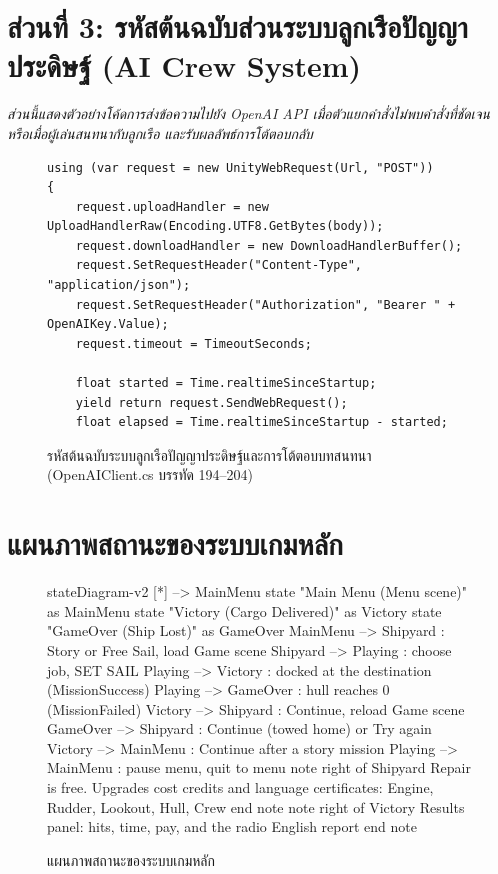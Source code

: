 \section*{ส่วนที่ 3: รหัสต้นฉบับส่วนระบบลูกเรือปัญญาประดิษฐ์ (AI Crew System)}
\textit{ส่วนนี้แสดงตัวอย่างโค้ดการส่งข้อความไปยัง OpenAI API เมื่อตัวแยกคำสั่งไม่พบคำสั่งที่ชัดเจนหรือเมื่อผู้เล่นสนทนากับลูกเรือ และรับผลลัพธ์การโต้ตอบกลับ}


\begin{figure}[H]
\centering
\begin{lstlisting}[language={[Sharp]C},basicstyle=\ttfamily\footnotesize,firstnumber=194]
using (var request = new UnityWebRequest(Url, "POST"))
{
    request.uploadHandler = new UploadHandlerRaw(Encoding.UTF8.GetBytes(body));
    request.downloadHandler = new DownloadHandlerBuffer();
    request.SetRequestHeader("Content-Type", "application/json");
    request.SetRequestHeader("Authorization", "Bearer " + OpenAIKey.Value);
    request.timeout = TimeoutSeconds;

    float started = Time.realtimeSinceStartup;
    yield return request.SendWebRequest();
    float elapsed = Time.realtimeSinceStartup - started;
\end{lstlisting}
\caption{รหัสต้นฉบับระบบลูกเรือปัญญาประดิษฐ์และการโต้ตอบบทสนทนา (OpenAIClient.cs บรรทัด 194--204)}
\label{fig:code_ai}
\end{figure}


\section*{แผนภาพสถานะของระบบเกมหลัก}


\begin{figure}[H]
\centering
\begin{mermaid}
stateDiagram-v2
    [*] --> MainMenu
    state "Main Menu (Menu scene)" as MainMenu
    state "Victory (Cargo Delivered)" as Victory
    state "GameOver (Ship Lost)" as GameOver
    MainMenu --> Shipyard : Story or Free Sail, load Game scene
    Shipyard --> Playing : choose job, SET SAIL
    Playing --> Victory : docked at the destination (MissionSuccess)
    Playing --> GameOver : hull reaches 0 (MissionFailed)
    Victory --> Shipyard : Continue, reload Game scene
    GameOver --> Shipyard : Continue (towed home) or Try again
    Victory --> MainMenu : Continue after a story mission
    Playing --> MainMenu : pause menu, quit to menu
    note right of Shipyard
        Repair is free.
        Upgrades cost credits and language certificates:
        Engine, Rudder, Lookout, Hull, Crew
    end note
    note right of Victory
        Results panel: hits, time, pay,
        and the radio English report
    end note
\end{mermaid}
\caption{แผนภาพสถานะของระบบเกมหลัก}
\label{fig:state_main}
\end{figure}
